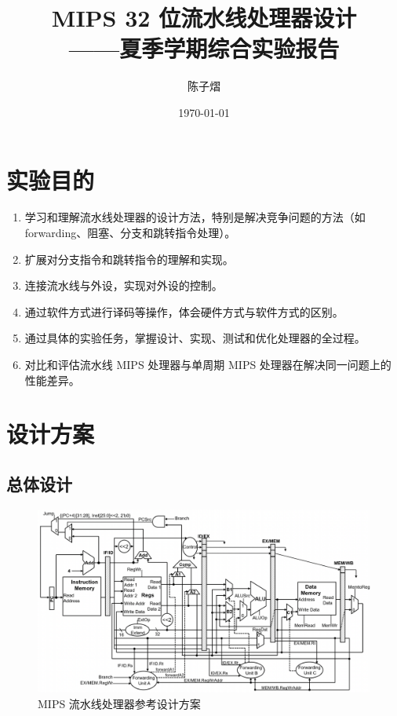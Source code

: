 \documentclass[a4paper]{article}  %
\begin{document}
\title{\textbf{MIPS 32 位流水线处理器设计}\\——夏季学期综合实验报告}
\author{陈子熠}
\date{\today}
\maketitle


\tableofcontents

\newpage

\section{实验目的}

\begin{enumerate}[1]
    \item 学习和理解流水线处理器的设计方法，特别是解决竞争问题的方法（如 forwarding、阻塞、分支和跳转指令处理）。
    \item 扩展对分支指令和跳转指令的理解和实现。
    \item 连接流水线与外设，实现对外设的控制。
    \item 通过软件方式进行译码等操作，体会硬件方式与软件方式的区别。
    \item 通过具体的实验任务，掌握设计、实现、测试和优化处理器的全过程。
    \item 对比和评估流水线 MIPS 处理器与单周期 MIPS 处理器在解决同一问题上的性能差异。
\end{enumerate}


\section{设计方案}

\subsection{总体设计}

\begin{figure}[ht]
    \centering
    \includegraphics[width=.8\textwidth]{asserts/pipeline_design.png}
    \caption{
        MIPS 流水线处理器参考设计方案
    }\label{fig:pipeline_design}
\end{figure}
\end{document}
